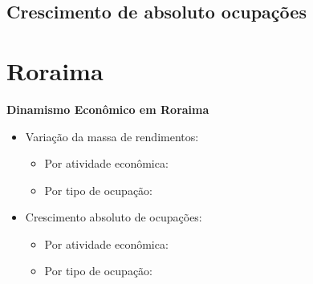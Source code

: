 \documentclass[8pt]{beamer}
\begin{document}
\begin{frame}
\textit{\hyperlink{indice_principal_amz_ro}{}}

\end{frame}

\begin{frame}
\textit{\hyperlink{indice_principal_amz_ro}{}}

\end{frame}

\subsection{Crescimento de absoluto ocupações}

\begin{frame}
\textit{\hyperlink{indice_principal_amz_ro}{}}

\end{frame}

\begin{frame}
\textit{\hyperlink{indice_principal_amz_ro}{}}

\end{frame}

\section{Roraima}

\begin{frame}[label=indice_principal_amz_rr]{}

\textit{\hyperlink{indice_principal}{}}

\textbf{Dinamismo Econômico em Roraima}
\vspace{2mm}

\begin{itemize}

\item{Variação da massa de rendimentos:
	\begin{itemize}
	\item{Por atividade econômica: \hyperlink{amzrrrkngvmassaporcnae2dig}{}}
	\item{Por tipo de ocupação: \hyperlink{amzrrrkngvmassaporcod2dig}{}}
	\end{itemize}
}
\vspace{1mm}

\item{Crescimento  absoluto de ocupações:
	\begin{itemize}
	\item{Por atividade econômica: \hyperlink{amzrrrkngnocuporcnae2dig}{}}
	\item{Por tipo de ocupação: \hyperlink{amzrrrkngnocuporcod2dig}{}}
	\end{itemize}
}
\vspace{1mm}

\end{itemize}

\end{frame}
\end{document}
